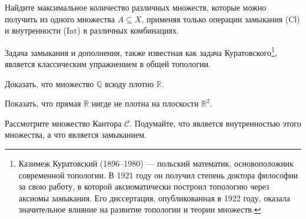 \begin{task}
	Найдите максимальное количество различных множеств, которые можно получить из одного множества \( A \subseteq X \), применяя только операции замыкания (\( \text{Cl} \)) и внутренности (\( \text{Int} \)) в различных комбинациях.  
\end{task}
Задача замыкания и дополнения, также известная как задача Куратовского\footnote{Казимеж Куратовский (1896–1980) — польский математик, основоположник современной топологии. В 1921 году он получил степень доктора философии за свою работу, в которой аксиоматически построил топологию через аксиомы замыкания. Его диссертация, опубликованная в 1922 году, оказала значительное влияние на развитие топологии и теории множеств.}, является классическим упражнением в общей топологии.

\begin{task}
	Доказать, что множество \(\mathbb{Q}\) всюду плотно \(\mathbb{R}\).
\end{task}

\begin{task}
	Показать, что прямая \(\mathbb{R}\) нигде не плотна на плоскости \(\mathbb{R}^2\).
\end{task}
\begin{task}
    Рассмотрите множество Кантора \( \mathcal{C}\). Подумайте, что является внутренностью этого множества, а что является замыканием.
\end{task}
